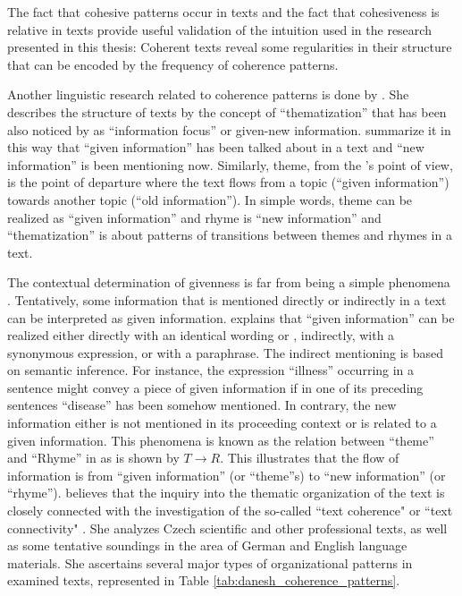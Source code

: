 The fact that cohesive patterns occur in texts and the fact that cohesiveness is relative in texts provide useful validation of the intuition used in the research presented in this thesis: Coherent texts reveal some regularities in their structure that can be encoded by the frequency of coherence patterns. 

Another linguistic research related to coherence patterns is done by . 
She describes the structure of texts by the concept  of ``thematization'' that has been also noticed by  as ``information focus'' or given-new information. 
 summarize it in this way that ``given information'' has been talked about in a text and ``new information'' is been mentioning now.  
Similarly, theme, from the 's point of view, is the point of departure where the text flows from a topic (``given information'') towards another topic (``old information''). 
In simple words, theme can be realized as ``given information'' and rhyme is ``new information'' and ``thematization''  is about  patterns of transitions between themes and rhymes in a text. 

The contextual determination of givenness is far from being a simple phenomena \cite{danes74a}. 
Tentatively, some information that is mentioned directly or indirectly in a text can be interpreted as given information. 
 explains that ``given information'' can be realized either directly with an identical wording or , indirectly, with a synonymous expression, or with a paraphrase. 
The indirect mentioning is based on semantic inference. 
For instance, the expression ``illness'' occurring in a sentence might convey a piece of given information if in one of its preceding sentences ``disease'' has been somehow mentioned. 
In contrary, the new information either is not mentioned in its proceeding context or is related to a given information. 
This phenomena is known as the relation between ``theme'' and ``Rhyme'' in  as is shown by  $T \rightarrow R$. 
This illustrates that the flow of information is from ``given information'' (or ``theme''s) to ``new information'' (or ``rhyme'').
 believes that the inquiry into the thematic organization of the text is closely connected with the investigation of the so-called ``text coherence" or ``text connectivity" .
She analyzes Czech scientific and other professional texts, as well as some tentative soundings in the area of German and English language materials.
She ascertains several major types of organizational patterns in examined texts, represented in Table \ref{tab:danesh_coherence_patterns}. 


